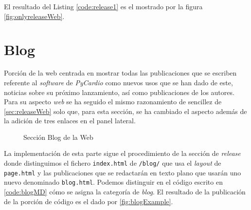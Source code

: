 El resultado del Listing \ref{code:release1} es el mostrado por la figura \ref{fig:onlyreleaseWeb}. 


\section{Blog}
\label{sec:blogWeb}
Porción de la web centrada en mostrar todas las publicaciones que se escriben referente al \textit{software} de \textit{PyCardio} como nuevos usos que se han dado de este, noticias sobre su próximo lanzamiento, así como  publicaciones de los autores. Para su aspecto \textit{web} se ha seguido el mismo razonamiento de sencillez  de \ref{sec:releaseWeb} solo que, para esta sección, se ha cambiado el aspecto además de la adición de tres enlaces en el panel lateral. 

\begin{figure}[H]
    \centering
    \caption{Sección Blog de la Web}
    \label{fig:blogWeb}
\end{figure}

La implementación de esta parte sigue el procedimiento de la sección de \textit{release} donde distinguimos el fichero \texttt{index.html} de \texttt{/blog/} que usa el \textit{layout} de \texttt{page.html} y las publicaciones que se redactarán en texto plano que usarán uno nuevo denominado \texttt{blog.html}. Podemos distinguir en el código escrito en \ref{code:blogMD} cómo se asigna la categoría de \textit{blog}. El resultado de la publicación de la porción de código es el dado por \ref{fig:blogExample}.

